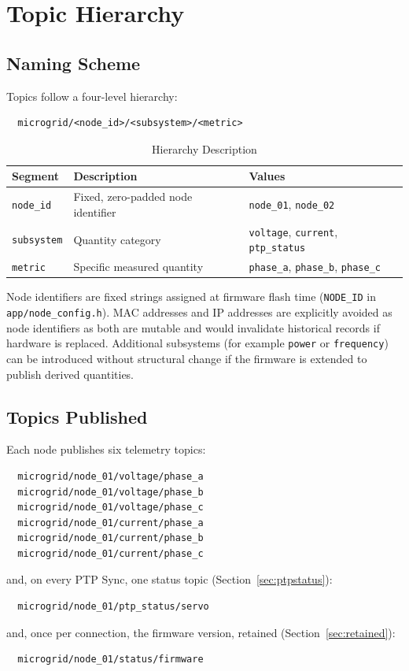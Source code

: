 \section{Topic Hierarchy}
\subsection{Naming Scheme}
Topics follow a four-level hierarchy:
\begin{lstlisting}
  microgrid/<node_id>/<subsystem>/<metric>
\end{lstlisting}

\begin{table}[H]
\caption{Hierarchy Description}
\centering
  \begin{tabular}{lll}
    \hline
    \textbf{Segment} & \textbf{Description} & \textbf{Values} \\
    \hline
    \texttt{node\_id} & Fixed, zero-padded node identifier & \texttt{node\_01}, \texttt{node\_02} \\
    \texttt{subsystem} & Quantity category & \texttt{voltage}, \texttt{current}, \texttt{ptp\_status} \\
    \texttt{metric} & Specific measured quantity & \texttt{phase\_a}, \texttt{phase\_b}, \texttt{phase\_c} \\
    \hline
  \end{tabular}
\end{table}

Node identifiers are fixed strings assigned at firmware flash time (\texttt{NODE\_ID} in \texttt{app/node\_config.h}). MAC addresses and IP addresses are explicitly avoided as node identifiers as both are mutable and would invalidate historical records if hardware is replaced. Additional subsystems (for example \texttt{power} or \texttt{frequency}) can be introduced without structural change if the firmware is extended to publish derived quantities.

\subsection{Topics Published}
Each node publishes six telemetry topics:
\begin{lstlisting}
  microgrid/node_01/voltage/phase_a
  microgrid/node_01/voltage/phase_b
  microgrid/node_01/voltage/phase_c
  microgrid/node_01/current/phase_a
  microgrid/node_01/current/phase_b
  microgrid/node_01/current/phase_c
\end{lstlisting}
and, on every PTP Sync, one status topic (Section~\ref{sec:ptpstatus}):
\begin{lstlisting}
  microgrid/node_01/ptp_status/servo
\end{lstlisting}
and, once per connection, the firmware version, retained (Section~\ref{sec:retained}):
\begin{lstlisting}
  microgrid/node_01/status/firmware
\end{lstlisting}

